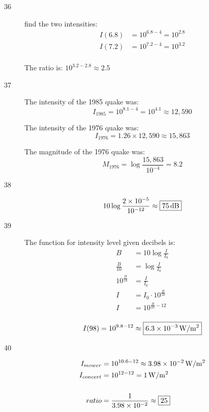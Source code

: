 \documentclass{exam}
\begin{document}
\begin{description}
      \item[36]
        find the two intensities:
        \begin{align*}
          I(6.8) &= 10^{6.8 - 4} = 10^{2.8} \\
          I(7.2) &= 10^{7.2 - 4} = 10^{3.2} \\
        \end{align*}

        The ratio is: $10^{3.2 - 2.8} \approx \boxed{2.5}$ 

      \pagebreak

      \item[37]
        The intensity of the 1985 quake was:
        \[
          I_{1985} = 10^{8.1 - 4} = 10^{4.1} \approx 12,590
        \]

        The intensity of the 1976 quake was: 
        \[
          I_{1976} = 1.26 \times 12,590 \approx 15,863
        \]

        The magnitude of the 1976 quake was:
        \[
          M_{1976} = \log \frac{15,863}{10^{-4}} = \boxed{8.2}
        \]

      \item[38]
        \[
          10 \log \frac{2 \times 10^{-5}}{10^{-12}} \approx \boxed{\unit[75]{dB}} 
        \]

      \item[39]
        The function for intensity level given decibels is:
        \begin{align*}
          B                 & = 10 \log \frac{I}{I_0} \\
          \frac{B}{10}      & = \log \frac{I}{I_0} \\
          10^{\frac{B}{10}} & = \frac{I}{I_0} \\
          I                 & = I_0 \cdot 10^{\frac{B}{10}} \\
          I                 & = 10^{\frac{B}{10} - 12} \\
        \end{align*}

        \[
          I(98) = 10^{9.8 - 12} \approx \boxed{ \unit[6.3 \times 10^{-3}]{W/m^2} }
        \]

      \item[40]
        \begin{align*}
          I_{mower}   & = 10^{10.6 - 12} \approx \unit[3.98 \times 10^{-2}]{W/m^2} \\
          I_{concert} & = 10^{12 - 12} = \unit[1]{W/m^2} \\
          \\
          ratio       & = \frac{1}{3.98 \times 10^{-2}} \approx \boxed{25} \\
        \end{align*}

    \end{description}
\end{document}
